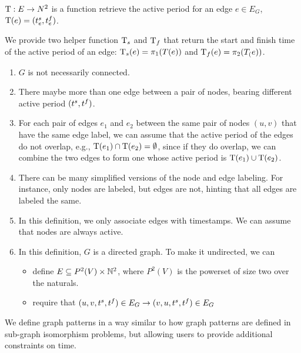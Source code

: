 $\text{T} : E \to N^2$ is a function retrieve the active period for an edge $e \in E_G$, $\text{T}(e) = (t^s_e, t^f_e)$.

We provide two helper function $\text{T}_s$ and $\text{T}_f$ that return the start and
  finish time of the active period of an edge: $\text{T}_s(e) = \pi_1(T(e))$ and $\text{T}_f(e) =
  \pi_2(T_(e))$.
  

\SmallSpace


\begin{enumerate}
	\item $G$ is not necessarily connected. 
	
	\item There maybe more than one edge between a pair of nodes, bearing
          different active period $(t^s, t^f)$.
		
	\item For each pair of edges $e_1$ and $e_2$ between the same pair of
          nodes $(u,v)$ that have the same edge label, we can assume that the
          active period of the edges do not overlap, e.g., $\text{T}(e_1) \cap \text{T}(e_2)
          = \emptyset$, since if they do overlap, we can combine the two edges
          to form one whose active period is $\text{T}(e_1) \cup \text{T}(e_2)$.

	\item There can be many simplified versions of the node and edge
          labeling. For instance, only nodes are labeled, but edges are not,
          hinting that all edges are labeled the same.
	
	\item In this definition, we only associate edges with timestamps. We
          can assume that nodes are always active.
	
	\item In this definition, $G$ is a directed graph.  To make it
          undirected, we can
	\begin{itemize}
		\item define $E \subseteq P^2(V) \times \mathbb{N}^2$, where $P^2(V)$ is
                  the powerset of size two over the naturals.
		\item require that $(u,v, t^s, t^f ) \in E_G \rightarrow
                  (v,u,t^s, t^f) \in E_G$
	\end{itemize}
\end{enumerate}

We define graph patterns in a way similar to how graph patterns are defined in
sub-graph isomorphism problems, but allowing users to provide additional constraints on
time.

